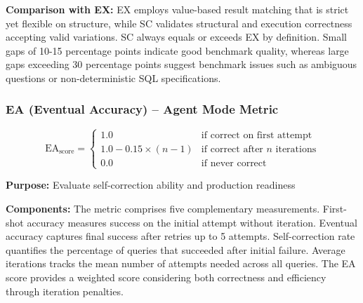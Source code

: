 \textbf{Comparison with EX:} EX employs value-based result matching that is strict yet flexible on structure, while SC validates structural and execution correctness accepting valid variations. SC always equals or exceeds EX by definition. Small gaps of 10-15 percentage points indicate good benchmark quality, whereas large gaps exceeding 30 percentage points suggest benchmark issues such as ambiguous questions or non-deterministic SQL specifications.

\subsubsection{EA (Eventual Accuracy) -- Agent Mode Metric}

\begin{equation}
\text{EA}_{\text{score}} = \begin{cases}
1.0 & \text{if correct on first attempt} \\
1.0 - 0.15 \times (n-1) & \text{if correct after } n \text{ iterations} \\
0.0 & \text{if never correct}
\end{cases}
\end{equation}

\textbf{Purpose:} Evaluate self-correction ability and production readiness

\textbf{Components:} The metric comprises five complementary measurements. First-shot accuracy measures success on the initial attempt without iteration. Eventual accuracy captures final success after retries up to 5 attempts. Self-correction rate quantifies the percentage of queries that succeeded after initial failure. Average iterations tracks the mean number of attempts needed across all queries. The EA score provides a weighted score considering both correctness and efficiency through iteration penalties.


